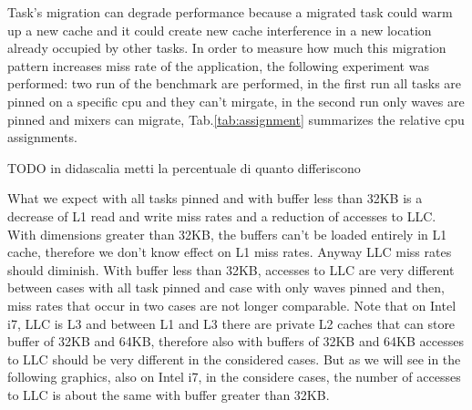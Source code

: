 Task's migration can degrade performance because a migrated task could warm up a new cache and it could create new cache interference in a new 
location already occupied by other tasks. In order to measure how much this migration pattern increases miss rate of the application, the following 
experiment was performed: two run of the benchmark are performed, in the first run all tasks are pinned on a specific cpu and they can't mirgate, in 
the second run only waves are pinned and mixers can migrate, Tab.\ref{tab:assignment} summarizes the relative cpu assignments. 

\begin{table}[tbp]
\centering%
\hspace{4em}
\label{tab:assignment}
\caption{CPUs assignment}
\end{table}
TODO in didascalia metti la percentuale di quanto differiscono

What we expect with all tasks pinned and with buffer less than 32KB is a decrease of L1 read and write miss rates and a reduction of accesses to LLC. 
With dimensions greater than 32KB, the buffers can't be loaded entirely in L1 cache, therefore we don't know effect on L1 miss rates. Anyway LLC miss 
rates should diminish. With buffer less than 32KB, accesses to LLC are very different between cases with all task pinned and case with only waves 
pinned and then, miss rates that occur in two cases are not longer comparable. Note that on Intel i7, LLC is L3 and between L1 and L3 there are private L2 
caches that can store buffer of 32KB and 64KB, therefore also with buffers of 32KB and 64KB accesses to LLC should be very different in the considered cases.
But as we will see in the following graphics, also on Intel i7, in the considere cases, the number of accesses to LLC is about the same with buffer greater 
than 32KB. 

